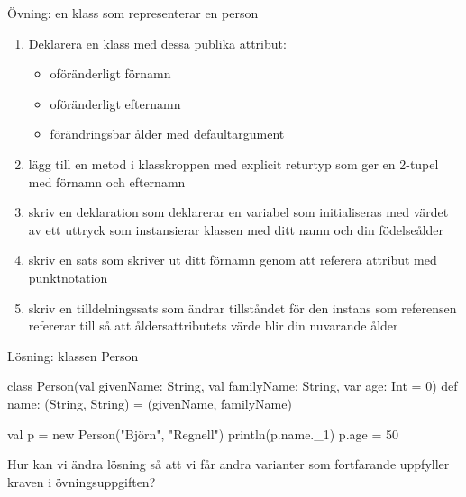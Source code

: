 \begin{Slide}{Övning: en klass som representerar en person}
\begin{enumerate}
  \item Deklarera en klass  med dessa publika attribut:
  \begin{itemize}
    \item oföränderligt förnamn
    \item oföränderligt efternamn
    \item förändringsbar ålder med defaultargument 
  \end{itemize}
  \item lägg till en metod i klasskroppen med explicit returtyp som ger en 2-tupel med förnamn och efternamn
  \item skriv en deklaration som deklarerar en variabel  som initialiseras med värdet av ett uttryck som instansierar klassen  med ditt namn och din födelseålder
  \item skriv en sats som skriver ut ditt förnamn genom att referera attribut med punktnotation
  \item skriv en tilldelningssats som ändrar tillståndet för den instans som referensen  refererar till så att åldersattributets värde blir din nuvarande ålder
\end{enumerate}
\end{Slide}



\begin{Slide}{Lösning: klassen Person}
\begin{Code}[basicstyle=\SlideFontSize{6.9}{9}\ttfamily]
class Person(val givenName: String, val familyName: String, var age: Int = 0){
  def name: (String, String) = (givenName, familyName)
}
\end{Code}
\begin{REPLnonum}[basicstyle=\SlideFontSize{7}{9}\ttfamily\color{white}]
val p = new Person("Björn", "Regnell")
println(p.name._1)
p.age = 50
\end{REPLnonum}
\pause
Hur kan vi ändra lösning så att vi får andra varianter som fortfarande uppfyller kraven i övningsuppgiften?
\end{Slide}


